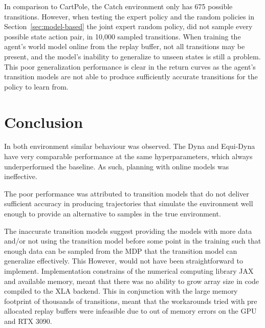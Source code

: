 In comparison to CartPole, the Catch environment only has 675 possible transitions. However, when testing the expert policy and the random policies in Section~\ref{sec:model-based} the joint expert random policy, did not sample every possible state action pair, in 10,000 sampled transitions. When training the agent's world model online from the replay buffer, not all transitions may be present, and the model's inability to generalize to unseen states is still a problem. This poor generalization performance is clear in the return curves as the agent's transition models are not able to produce sufficiently accurate transitions for the policy to learn from.


\section{Conclusion}
In both environment similar behaviour was observed. The Dyna and Equi-Dyna have very comparable performance at the same hyperparameters, which always underperformed the baseline. As such, planning with online models was ineffective.

The poor performance was attributed to transition models that do not deliver sufficient accuracy in producing trajectories that simulate the environment well enough to provide an alternative to samples in the true environment.

The inaccurate transition models suggest providing the models with more data and/or not using the transition model before some point in the training such that enough data can be sampled from the MDP that the transition model can generalize effectively. This However, would not have been straightforward to implement. Implementation constrains of the numerical computing library JAX and available memory, meant that there was no ability to grow array size in code compiled to the XLA backend. This in conjunction with the large memory footprint of thousands of transitions, meant that the workarounds tried with pre allocated replay buffers were infeasible due to out of memory errors on the GPU and RTX 3090.

